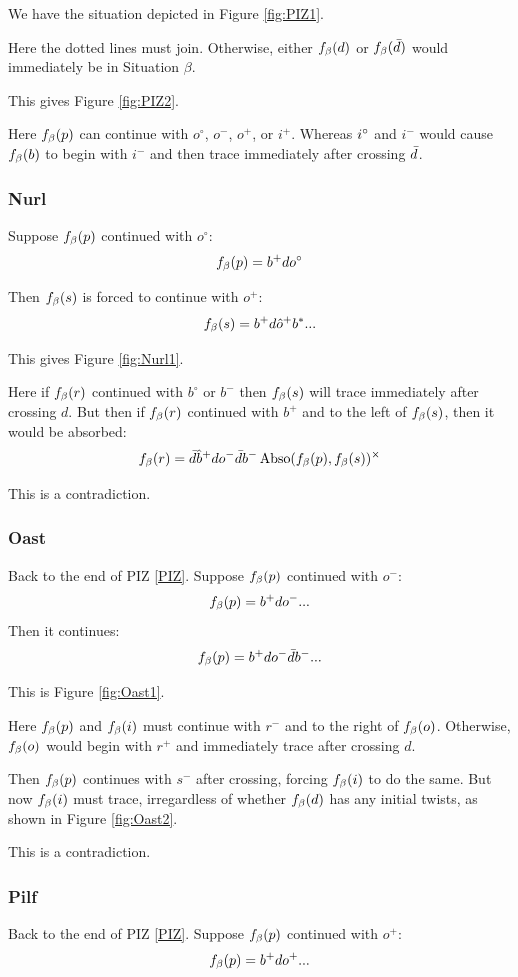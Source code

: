 We have the situation depicted in Figure \ref{fig:PIZ1}.

Here the dotted lines must join. Otherwise, either $f_\beta(d)$ or $f_\beta(\bar{d})$ would immediately be in Situation $\beta$.

This gives Figure \ref{fig:PIZ2}.

Here $f_\beta(p)$ can continue with $o^\circ$, $o^-$, $o^+$, or $i^+$. Whereas $i^\circ$ and $i^-$ would cause $f_\beta(b)$ to begin with $i^-$ and then trace immediately after crossing $\bar{d}$.

\subsubsection{Nurl}\label{Nurl}
Suppose $f_\beta(p)$ continued with $o^\circ$:
\[
f_\beta(p) = b^+ d o^\circ
\]

Then $f_\beta(s)$ is forced to continue with $o^+$:
\[
f_\beta(s) = b^+ d \hat{o}^+ b^*...
\]

This gives Figure \ref{fig:Nurl1}.

Here if $f_\beta(r)$ continued with $b^\circ$ or $b^-$ then $f_\beta(s)$ will trace immediately after crossing $d$. But then if $f_\beta(r)$ continued with $b^+$ and to the left of $f_\beta(s)$, then it would be absorbed:
\[
f_\beta(r) = \bar{d} \hat{b}^+ d o^- \bar{d} b^- \operatorname{Abso}(f_\beta(p), f_\beta(s))^\times
\]

This is a contradiction.

\subsubsection{Oast}\label{Oast}
Back to the end of PIZ \ref{PIZ}. Suppose $f_\beta(p)$ continued with $o^-$:
\[
f_\beta(p) = b^+ d o^-...
\]
Then it continues:
\[
f_\beta(p) = b^+ d o^- \bar{d} b^-...
\]

This is Figure \ref{fig:Oast1}.

Here $f_\beta(p)$ and $f_\beta(i)$ must continue with $r^-$ and to the right of $f_\beta(o)$. Otherwise, $f_\beta(o)$ would begin with $r^+$ and immediately trace after crossing $d$.

Then $f_\beta(p)$ continues with $s^-$ after crossing, forcing $f_\beta(i)$ to do the same. But now $f_\beta(i)$ must trace, irregardless of whether $f_\beta(d)$ has any initial twists, as shown in Figure \ref{fig:Oast2}.

This is a contradiction.

\subsubsection{Pilf}\label{Pilf}
Back to the end of PIZ \ref{PIZ}. Suppose $f_\beta(p)$ continued with $o^+$:
\[
f_\beta(p) = b^+ d o^+...
\]

